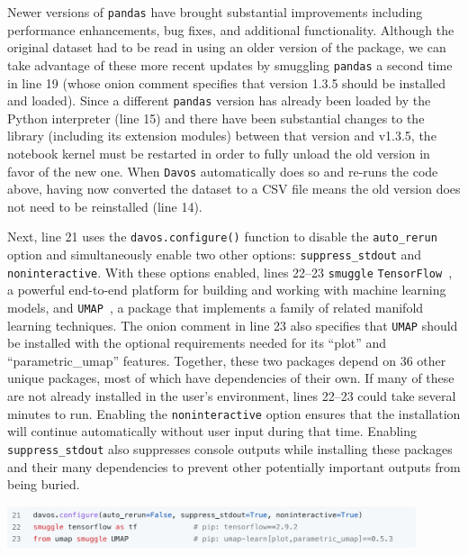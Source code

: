 \documentclass[preprint,12pt,a4paper]{elsarticle}
\begin{document}
Newer versions of \texttt{pandas} have brought substantial improvements
including performance enhancements, bug fixes, and additional functionality. Although
the original dataset had to be read in using an older version of the package,
we can take advantage of these more recent updates by smuggling \texttt{pandas}
a second time in line 19 (whose onion comment specifies that version 1.3.5
should be installed and loaded). Since a different \texttt{pandas} version
has already been loaded by the Python interpreter (line 15) and there have been
substantial changes to the library (including its extension modules)
between that version and v1.3.5, the notebook
kernel must be restarted in order to fully unload the old version in favor of
the new one.
When \texttt{Davos} automatically does so and re-runs the code above, having now converted the dataset to a CSV file means the old version does not need to be reinstalled (line 14).

Next, line 21 uses the \texttt{davos.configure()} function to disable
the \texttt{auto\_rerun} option and simultaneously enable two other
options: \texttt{suppress\_stdout} and \texttt{noninteractive}. With
these options enabled, lines 22--23 \texttt{smuggle}
\texttt{TensorFlow}~\cite{AbadEtal15}, a powerful end-to-end platform
for building and working with machine learning models, and
\texttt{UMAP}~\cite{McInEtal18}, a package that implements a family
of related manifold learning techniques. The onion comment in line 23
also specifies that \texttt{UMAP} should be installed with the
optional requirements needed for its ``plot'' and ``parametric\_umap''
features. Together, these two packages depend on 36 other unique
packages, most of which have dependencies of their own. If many of
these are not already installed in the user's environment, lines
22--23 could take several minutes to run.  Enabling the
\texttt{noninteractive} option ensures that the installation will
continue automatically without user input during that time.  Enabling
\texttt{suppress\_stdout} also suppresses console outputs while installing
these packages and their many dependencies to prevent other potentially important outputs from being buried.
\begin{center}
\includegraphics[width=0.9\textwidth]{figs/example5}
\end{center}
\end{document}
